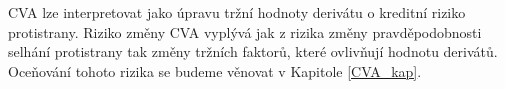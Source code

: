 \documentclass[a4paper,12pt]{report}
\theoremstyle{definition} \newtheorem{definice}[veta]{Definice}
\theoremstyle{remark}
\begin{document}
CVA lze interpretovat jako úpravu tržní hodnoty derivátu o kreditní riziko protistrany.
Riziko změny CVA vyplývá jak z rizika změny pravděpodobnosti selhání protistrany tak změny tržních faktorů, které ovlivňují hodnotu derivátů.
Oceňování tohoto rizika se budeme věnovat v Kapitole \ref{CVA_kap}.




\end{document}
